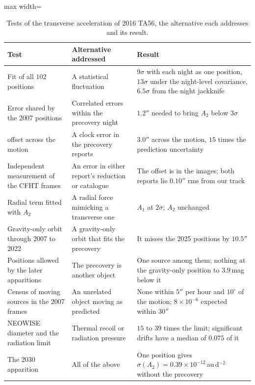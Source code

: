 \documentclass[3p,11pt]{elsarticle}
\begin{document}
\begin{table}[tbp]
\centering\small\linespread{1.0}\selectfont
\caption{Tests of the transverse acceleration of 2016 TA56, the alternative each addresses
and its result.}
\label{tab:tests}
\begin{adjustbox}{max width=\textwidth}
\begin{tabular}{>{\raggedright\arraybackslash}p{}>{\raggedright\arraybackslash}p{}>{\raggedright\arraybackslash}p{}}
\toprule
Test & Alternative addressed & Result \\
\midrule
Fit of all $102$ positions & A statistical fluctuation & $9\sigma$ with each night as one
position, $13\sigma$ under the night-level covariance, $6.5\sigma$ from the night jackknife \\
Error shared by the 2007 positions & Correlated errors within the precovery night & $1.2''$
needed to bring $A_2$ below $3\sigma$ \\
2007 offset across the motion & A clock error in the precovery reports & $3.0''$ across
the motion, $15$ times the prediction uncertainty \\
Independent measurement of the CFHT frames & An error in either report's reduction or catalogue &
The offset is in the images; both reports lie $0.10''$ rms from our track \\
Radial term fitted with $A_2$ & A radial force mimicking a transverse one & $A_1$
at $2\sigma$; $A_2$ unchanged \\
Gravity-only orbit through 2007 to 2022 & A gravity-only orbit that fits the precovery &
It misses the 2025 positions by $10.5''$ \\
Positions allowed by the later apparitions & The precovery is another object & One source
among them; nothing at the gravity-only position to $3.9$\,mag below it \\
Census of moving sources in the 2007 frames & An unrelated object moving as predicted &
None within $5''$ per hour and $10^\circ$ of the motion; $8\times10^{-6}$ expected within
$30''$ \\
NEOWISE diameter and the radiation limit & Thermal recoil or radiation pressure & $15$ to
$39$ times the limit; significant drifts have a median of $0.075$ of it \\
The 2030 apparition & All of the above & One position gives
$\sigma(A_2)=0.39\times10^{-12}$\,au\,d$^{-2}$ without the precovery \\
\bottomrule
\end{tabular}
\end{adjustbox}
\end{table}
\end{document}
